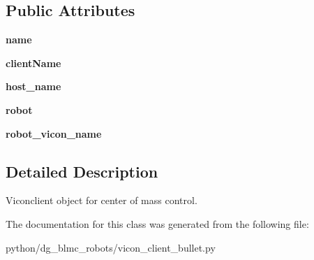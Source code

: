 \subsection*{Public Attributes}
\begin{DoxyCompactItemize}
\item 
{\bfseries name}\hypertarget{classdg__blmc__robots_1_1vicon__client__bullet_1_1ViconClientEntityBullet_a1ddef8f574b8896040ad633eb9a0dbb3}{}\label{classdg__blmc__robots_1_1vicon__client__bullet_1_1ViconClientEntityBullet_a1ddef8f574b8896040ad633eb9a0dbb3}

\item 
{\bfseries client\+Name}\hypertarget{classdg__blmc__robots_1_1vicon__client__bullet_1_1ViconClientEntityBullet_abde6b06ed30b53f8dd795525b769f225}{}\label{classdg__blmc__robots_1_1vicon__client__bullet_1_1ViconClientEntityBullet_abde6b06ed30b53f8dd795525b769f225}

\item 
{\bfseries host\+\_\+name}\hypertarget{classdg__blmc__robots_1_1vicon__client__bullet_1_1ViconClientEntityBullet_a5921647dcb6d6ebf39b9959b3edd5b06}{}\label{classdg__blmc__robots_1_1vicon__client__bullet_1_1ViconClientEntityBullet_a5921647dcb6d6ebf39b9959b3edd5b06}

\item 
{\bfseries robot}\hypertarget{classdg__blmc__robots_1_1vicon__client__bullet_1_1ViconClientEntityBullet_a03ece4ab19d26f437a053842e7ea1395}{}\label{classdg__blmc__robots_1_1vicon__client__bullet_1_1ViconClientEntityBullet_a03ece4ab19d26f437a053842e7ea1395}

\item 
{\bfseries robot\+\_\+vicon\+\_\+name}\hypertarget{classdg__blmc__robots_1_1vicon__client__bullet_1_1ViconClientEntityBullet_a2992fafe240d0e2a48c1912bec324216}{}\label{classdg__blmc__robots_1_1vicon__client__bullet_1_1ViconClientEntityBullet_a2992fafe240d0e2a48c1912bec324216}

\end{DoxyCompactItemize}


\subsection{Detailed Description}
Viconclient object for center of mass control. 

The documentation for this class was generated from the following file\+:\begin{DoxyCompactItemize}
\item 
python/dg\+\_\+blmc\+\_\+robots/vicon\+\_\+client\+\_\+bullet.\+py\end{DoxyCompactItemize}
